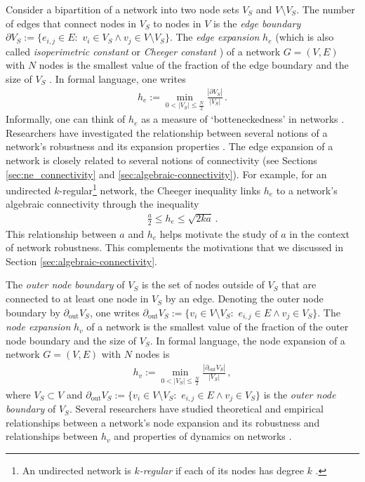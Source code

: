 \documentclass{comnet-mod}
\begin{document}
Consider a bipartition of a network into two node sets $V_S$ and $V\setminus V_S$. The number of edges that connect nodes in $V_S$ to nodes in $V$ is the \textit{edge boundary} $\partial V_S:= \{e_{i,j}\in E:\,\,v_i \in V_S \land v_j \in V\setminus V_S\}$. The \textit{edge expansion} $h_e$ (which is also called \textit{isoperimetric constant} or \textit{Cheeger constant} \cite{VanMieghem2023}) of a network $G=(V,E)$ with $N$ nodes is the smallest value of the fraction of the edge boundary and the size of $V_S$ \cite{VanMieghem2023}. In formal language, one writes \cite[p.\,152]{VanMieghem2023}
\begin{align}
	h_e := \min_{0<|V_S|\leq\frac{N}{2}}\frac{|\partial V_S|}{|V_S|}\,.\nonumber
\end{align}
Informally, one can think of $h_e$ as a measure of `botteneckedness' in networks \cite{Laszka2012}. Researchers have investigated the relationship between several notions of a network's robustness and its expansion properties \cite{Estrada2006, Estrada2007}. The edge expansion of a network is closely related to several notions of connectivity (see Sections \ref{sec:ne_connectivity} and \ref{sec:algebraic-connectivity}). For example, for an undirected $k$-regular\footnote{An undirected network is \textit{$k$-regular} if each of its nodes has degree $k$ \cite[p.\,2]{Akiyama2011}.} network, the Cheeger inequality \cite[p.\,153]{VanMieghem2023} links $h_e$ to a network's algebraic connectivity through the inequality
\begin{align}
	\frac{a}{2}\leq h_e\leq\sqrt{2ka}\,.\label{eq:cheeger}
\end{align}
This relationship between $a$ and $h_e$ helps motivate the study of $a$ in the context of network robustness. This complements the motivations that we discussed in Section \ref{sec:algebraic-connectivity}. 

The \textit{outer node boundary} of $V_S$ is the set of nodes outside of $V_S$ that are connected to at least one node in $V_S$ by an edge. Denoting the outer node boundary by $\partial_{\textrm{out}} V_S$, one writes $\partial_{\textrm{out}} V_S := \{v_i\in V\setminus V_S:\,\,e_{i,j} \in E \land v_j \in V_S\}$.
The \textit{node expansion} $h_v$ 
of a network is the smallest value
of the fraction of the outer node boundary and the size of $V_S$.
In formal language, the node expansion of a network $G=(V,E)$ with $N$ nodes is \cite[p.\,20]{Gao2019} 
\begin{align}
	h_v := \min_{0<|V_S|\leq\frac{N}{2}}\frac{|\partial_{\textrm{out}} V_S|}{|V_S|}\,,\nonumber
\end{align}
where $V_S\subset V$ and $\partial_{\textrm{out}} V_S := \{v_i\in V\setminus V_S:\,\,e_{i,j} \in E \land v_j \in V_S\}$ is the \textit{outer node boundary} of $V_S$. 
Several researchers have studied theoretical and empirical relationships between a network's node expansion and its robustness \cite{Bagchi2004, Barrett2004} and relationships between $h_v$ and properties of dynamics on networks \cite{Eubank2004, Sauerwald2011, Giakkoupis2012, Doerr2013}. 
\end{document}
